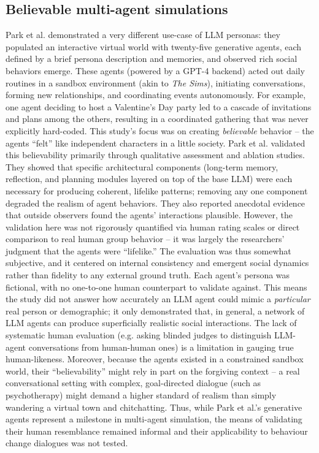 \subsection{Believable multi-agent simulations}
Park et al. \cite{Park2023} demonstrated a very different use-case of LLM personas: they populated an interactive virtual world with twenty-five generative agents, each defined by a brief persona description and memories, and observed rich social behaviors emerge. These agents (powered by a GPT-4 backend) acted out daily routines in a sandbox environment (akin to \textit{The Sims}), initiating conversations, forming new relationships, and coordinating events autonomously. For example, one agent deciding to host a Valentine’s Day party led to a cascade of invitations and plans among the others, resulting in a coordinated gathering that was never explicitly hard-coded. This study’s focus was on creating \emph{believable} behavior – the agents “felt” like independent characters in a little society. Park et al. validated this believability primarily through qualitative assessment and ablation studies. They showed that specific architectural components (long-term memory, reflection, and planning modules layered on top of the base LLM) were each necessary for producing coherent, lifelike patterns; removing any one component degraded the realism of agent behaviors. They also reported anecdotal evidence that outside observers found the agents’ interactions plausible. However, the validation here was not rigorously quantified via human rating scales or direct comparison to real human group behavior – it was largely the researchers’ judgment that the agents were “lifelike.” The evaluation was thus somewhat subjective, and it centered on internal consistency and emergent social dynamics rather than fidelity to any external ground truth. Each agent’s persona was fictional, with no one-to-one human counterpart to validate against. This means the study did not answer how accurately an LLM agent could mimic a \emph{particular} real person or demographic; it only demonstrated that, in general, a network of LLM agents can produce superficially realistic social interactions. The lack of systematic human evaluation (e.g. asking blinded judges to distinguish LLM-agent conversations from human-human ones) is a limitation in gauging true human-likeness. Moreover, because the agents existed in a constrained sandbox world, their “believability” might rely in part on the forgiving context – a real conversational setting with complex, goal-directed dialogue (such as psychotherapy) might demand a higher standard of realism than simply wandering a virtual town and chitchatting. Thus, while Park et al.’s generative agents represent a milestone in multi-agent simulation, the means of validating their human resemblance remained informal and their applicability to behaviour change dialogues was not tested.

